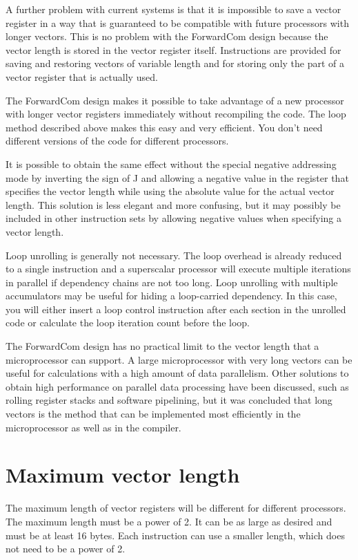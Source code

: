 \documentclass[forwardcom.tex]{subfiles}
\begin{document}
A further problem with current systems is that it is impossible to save a vector register in a way that is guaranteed to be compatible with future processors with longer vectors. This is no problem with the ForwardCom design because the vector length is stored in the vector register itself. Instructions are provided for saving and restoring vectors of variable length and for storing only the part of a vector register that is actually used.
\vspace{2mm}

The ForwardCom design makes it possible to take advantage of a new processor with longer vector registers immediately without recompiling the code. The loop method described above makes this easy and very efficient. You don't need different versions of the code for different processors.
\vspace{2mm}

It is possible to obtain the same effect without the special negative addressing mode by inverting the sign of J and allowing a negative value in the register that specifies the vector length while using the absolute value for the actual vector length. This solution is less elegant and more confusing, but it may possibly be included in other instruction sets by allowing negative values when specifying a vector length.
\vspace{2mm}

Loop unrolling is generally not necessary. The loop overhead is already reduced to a single instruction  and a superscalar processor will execute multiple iterations in parallel if dependency chains are not too long. Loop unrolling with multiple accumulators may be useful for hiding a loop-carried dependency. In this case, you will either insert a loop control instruction after each section in the unrolled code or calculate the loop iteration count before the loop.
\vspace{2mm}

The ForwardCom design has no practical limit to the vector length that a microprocessor can support. A large microprocessor with very long vectors can be useful for calculations with a high amount of data parallelism. Other solutions to obtain high performance on parallel data processing have been discussed, such as rolling register stacks and software pipelining, but it was concluded that long vectors is the method that can be implemented most efficiently in the microprocessor as well as in the compiler.

\section{Maximum vector length}
The maximum length of vector registers will be different for different processors. The maximum length must be a power of 2. It can be as large as desired and must be at least 16 bytes. Each instruction can use a smaller length, which does not need to be a power of 2.
\vspace{2mm}
\end{document}
